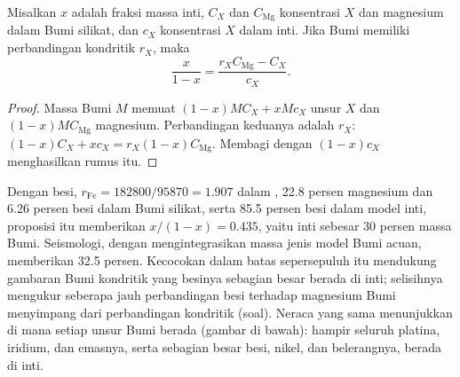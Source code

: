 \begin{proposition}
\label{prop:b2:elements-in-the-earth:core}
Misalkan $x$ adalah fraksi massa inti, $C_X$ dan $C_{\mathrm{Mg}}$ konsentrasi
$X$ dan magnesium dalam Bumi silikat, dan $c_X$ konsentrasi $X$ dalam
inti. Jika Bumi memiliki perbandingan kondritik $r_X$, maka
\[
  \frac{x}{1-x} = \frac{r_X C_{\mathrm{Mg}} - C_X}{c_X}.
\]
\end{proposition}

\begin{proof}
Massa Bumi $M$ memuat $(1-x)MC_X + xMc_X$ unsur $X$ dan $(1-x)MC_{\mathrm{Mg}}$
magnesium. Perbandingan keduanya adalah $r_X$:
$(1-x)C_X + xc_X = r_X(1-x)C_{\mathrm{Mg}}$. Membagi dengan $(1-x)c_X$ menghasilkan
rumus itu.
\end{proof}

Dengan besi, $r_{\mathrm{Fe}} = \num{182800}/\num{95870} = 1.907$ dalam ,
22.8 persen magnesium dan 6.26 persen besi dalam Bumi silikat, serta 85.5
persen besi dalam model inti, proposisi itu memberikan $x/(1-x) = 0.435$, yaitu inti sebesar 30
persen massa Bumi. Seismologi, dengan mengintegrasikan massa jenis model
Bumi acuan, memberikan 32.5 persen. Kecocokan dalam batas sepersepuluh itu
mendukung gambaran Bumi kondritik yang besinya sebagian besar berada di inti;
selisihnya mengukur seberapa jauh perbandingan besi terhadap magnesium Bumi menyimpang dari
perbandingan kondritik (soal). Neraca yang sama menunjukkan di mana setiap unsur Bumi berada
(gambar di bawah): hampir seluruh platina, iridium, dan emasnya, serta sebagian besar besi,
nikel, dan belerangnya, berada di inti.

\begin{omfigure}
\centering
{}
\par{}
\end{omfigure}

